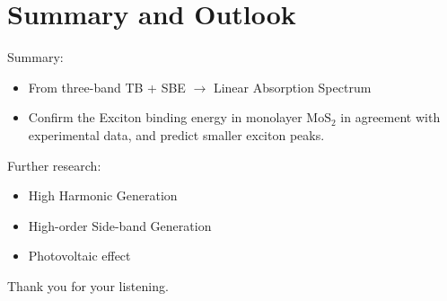 \documentclass{beamer}
\begin{document}
	\section{Summary and Outlook}
	\begin{frame}
	\begin{block}{Summary:}
\begin{itemize}
\item From three-band TB + SBE $\to $ Linear Absorption Spectrum
\item Confirm the Exciton binding energy in monolayer $\mathrm{MoS}_2$ in agreement with experimental data, and predict smaller exciton peaks.
\end{itemize}
	\end{block}
	\begin{exampleblock}{Further research:}
	\begin{itemize}
		\item High Harmonic Generation
		\item High-order Side-band Generation
		\item Photovoltaic effect
	\end{itemize}
\end{exampleblock}
	\begin{center}
		Thank you for your listening.
	\end{center}
	\end{frame}
	
\end{document}

